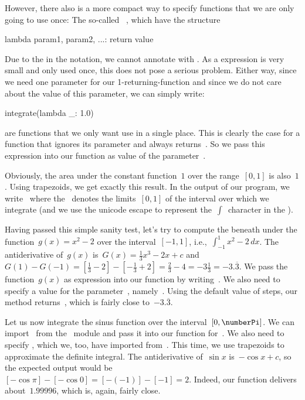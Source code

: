 However, there also is a more compact way to specify functions that we are only going to use once:
The so-called ~\cite{PSF2024L}, which have the structure%
%
\begin{pythonSyntax}
lambda param1, param2, ...: return value
\end{pythonSyntax}
%
Due to the \pythonilIdx{:} in the notation, we cannot annotate  with .
As a  expression is very small and only used once, this does not pose a serious problem.
Either way, since we need one parameter for our 1-returning-function and since we do not care about the value of this parameter, we can simply write:%
%
\begin{pythonSyntax}
integrate(lambda _: 1.0)
\end{pythonSyntax}
%
 are functions that we only want use in a single place.
This is clearly the case for a function that ignores its parameter and always returns~.
So we pass this expression into our  function as value of the parameter~.

Obviously, the area under the constant function~$1$ over the range~$[0,1]$ is also~$1$.
Using  trapezoids, we get exactly this result.
In the output of our program, we write~ where the~ denotes the limits~$[0,1]$ of the interval over which we integrate (and we use the unicode escape  to represent the~$\int$~character in the ).

Having passed this simple sanity test, let's try to compute the beneath under the function~$g(x)=x^2-2$ over the interval~$[-1,1]$, i.e.,~$\int_{-1}^1 x^2-2\,dx$.
The antiderivative of~$g(x)$ is~$G(x)=\frac{1}{3}x^3-2x+c$ and $G(1)-G(-1)=[\frac{1}{3}-2]-[-\frac{1}{3}+2]=\frac{2}{3}-4=-3\frac{1}{3}=-3.\overline{3}$.
We pass the function~$g(x)$ as  expression into our  function by writing~.
We also need to specify a value for the parameter~, namely~.
Using the default value of  steps, our method returns~, which is fairly close to~$-3.\overline{3}$.

Let us now integrate the sinus function over the interval~$[0,\numberPi]$.
We can import~ from the ~module and pass it into our function for~.
We also need to specify , which we, too, have imported from~.
This time, we use  trapezoids to approximate the definite integral.
The antiderivative of~$\sin x$ is~$-\cos x+c$, so the expected output would be~$[-\cos\pi]-[-\cos 0]=[-(-1)]-[-1]=2$.
Indeed, our function delivers about~$1.99996$, which is, again, fairly close.


